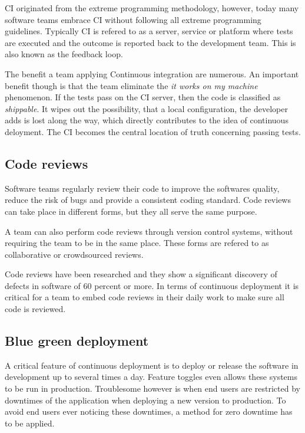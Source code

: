 CI originated from the extreme programming methodology, however, today many
software teams embrace CI without following all extreme programming guidelines.
Typically CI is refered to as a server, service or platform where tests are
executed and the outcome is reported back to the development team. This is also
known as the feedback loop.

The benefit a team applying Continuous integration are numerous. An important
benefit though is that the team eliminate the \textit{it works on my machine}
phenomenon. If the tests pass on the CI server, then the code is classified as
\textit{shippable}. It wipes out the possibility, that a local configuration,
the developer adds is lost along the way, which directly contributes to the
idea of continuous deloyment. The CI becomes the central location of truth
concerning passing tests.

\subsection{Code reviews}

Software teams regularly review their code to improve the softwares quality,
reduce the risk of bugs and provide a consistent coding standard. Code reviews
can take place in different forms, but they all serve the same purpose.

A team can also perform code reviews through version control systems, without
requiring the team to be in the same place. These forms are refered to as
collaborative or crowdsourced reviews.

Code reviews have been researched and they show a significant discovery of
defects in software of 60 percent or more. In terms of continuous deployment it
is critical for a team to embed code reviews in their daily work to make sure
all code is reviewed.

\subsection{Blue green deployment}

A critical feature of continuous deployment is to deploy or release the
software in development up to several times a day. Feature toggles even allows
these systems to be run in production. Troublesome however is when end users
are restricted by downtimes of the application when deploying a new version to
production. To avoid end users ever noticing these downtimes, a method for zero
downtime has to be applied.

